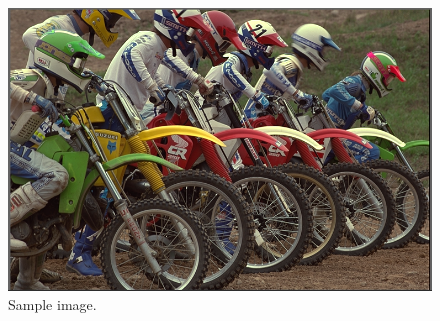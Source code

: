 \documentclass[14pt,a4paper]{extarticle}
\begin{document}
\begin{figure}[h]
\includegraphics[width=0.8\linewidth, center]{dataset/kodim05.png} 
\caption{Sample image.}
\label{fig:moto}
\end{figure}
\end{document}
